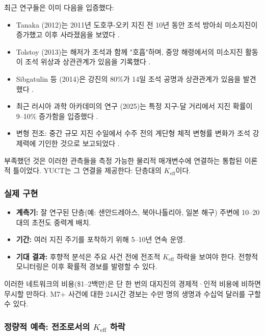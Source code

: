 \documentclass[12pt,a4paper]{article}
\theoremstyle{remark}
\begin{document}
	최근 연구들은 이미 다음을 입증했다:
	
	\begin{itemize}
		\item Tanaka (2012)는 2011년 도호쿠-오키 지진 전 10년 동안 조석 방아쇠 미소지진이 증가했고 이후 사라졌음을 보였다 \cite{Tanaka2012}.
		\item Tolstoy (2013)는 해저가 조석과 함께 "호흡"하며, 중앙 해령에서의 미소지진 활동이 조석 위상과 상관관계가 있음을 기록했다 \cite{Tolstoy2013}.
		\item Sibgatulin 등 (2014)은 강진의 80\%가 14일 조석 공명과 상관관계가 있음을 발견했다 \cite{Sibgatulin2014}.
		\item 최근 러시아 과학 아카데미의 연구 (2025)는 특정 지구-달 거리에서 지진 확률이 9–10\% 증가함을 입증했다 \cite{RAN2025}.
		\item 변형 전조: 중간 규모 지진 수일에서 수주 전의 계단형 체적 변형률 변화가 조석 강제력에 기인한 것으로 보고되었다 \cite{DeformationPrecursors2024}.
	\end{itemize}
	
	부족했던 것은 이러한 관측들을 측정 가능한 물리적 매개변수에 연결하는 통합된 이론적 틀이었다. YUCT는 그 연결을 제공한다: 단층대의 \(K_{\mathrm{eff}}\)이다.
	
	\subsubsection{실제 구현}
	
	\begin{itemize}
		\item \textbf{계측기:} 잘 연구된 단층(예: 샌안드레아스, 북아나톨리아, 일본 해구) 주변에 10–20대의 초전도 중력계 배치.
		\item \textbf{기간:} 여러 지진 주기를 포착하기 위해 5–10년 연속 운영.
		\item \textbf{기대 결과:} 후향적 분석은 주요 사건 전에 전조적 \(K_{\mathrm{eff}}\) 하락을 보여야 한다. 전향적 모니터링은 이후 확률적 경보를 발령할 수 있다.
	\end{itemize}
	
	이러한 네트워크의 비용(\$1–2백만)은 단 한 번의 대지진의 경제적·인적 비용에 비하면 무시할 만하다. M7+ 사건에 대한 24시간 경보는 수만 명의 생명과 수십억 달러를 구할 수 있다.
	
	\subsubsection{정량적 예측: 전조로서의 \(K_{\mathrm{eff}}\) 하락}
	\label{subsubsec:precursor}
	
\end{document}
